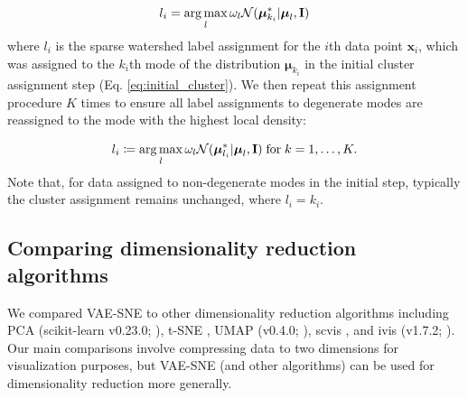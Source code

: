 \begin{equation}
    l_i = \operatorname*{arg\,max}_{l} \omega_l \mathcal{N}(\boldsymbol{\mu}^{*}_{k_i} | \boldsymbol{\mu}_l, \mathbf{I})
    \label{eq:sparse_assignment}
\end{equation}
where $l_i$ is the sparse watershed label assignment for the $i$th data point $\mathbf{x}_i$, which was assigned to the $k_i$th mode of the distribution $\boldsymbol{\mu}_{k_i}$ in the initial cluster assignment step (Eq. \ref{eq:initial_cluster}). We then repeat this assignment procedure $K$ times to ensure all label assignments to degenerate modes are reassigned to the mode with the highest local density:

\begin{equation}
    l_i \coloneqq \operatorname*{arg\,max}_{l} \omega_l \mathcal{N}(\boldsymbol{\mu}^{*}_{l_i} | \boldsymbol{\mu}_l, \mathbf{I}) \; \textrm{for} \; k = 1, \dots, K.
\end{equation}
Note that, for data assigned to non-degenerate modes in the initial step, typically the cluster assignment remains unchanged, where $l_i = k_i$. 



\subsection{Comparing dimensionality reduction algorithms}
We compared VAE-SNE to other dimensionality reduction algorithms including PCA (scikit-learn v0.23.0; \citealt{scikit-learn}), t-SNE \citep{maaten2008tsne}, UMAP (v0.4.0; \citealt{mcinnes2018umap}), scvis \citep{ding2018scvis}, and ivis (v1.7.2; \citealt{szubert2019ivis}). Our main comparisons involve compressing data to two dimensions for visualization purposes, but VAE-SNE (and other algorithms) can be used for dimensionality reduction more generally.

